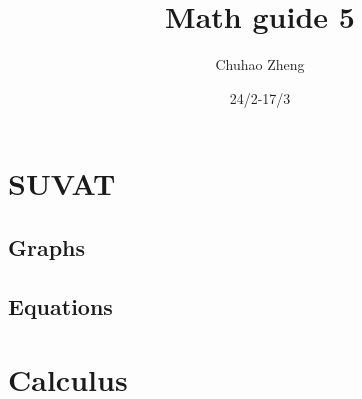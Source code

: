 \documentclass{article}
\title{Math guide 5}
\author{Chuhao Zheng}
\date{24/2-17/3}
\begin{document}
\maketitle
\tableofcontents
\newpage
\section{SUVAT}

\subsection{Graphs}
\subsection{Equations}
\section{Calculus}
\end{document}
